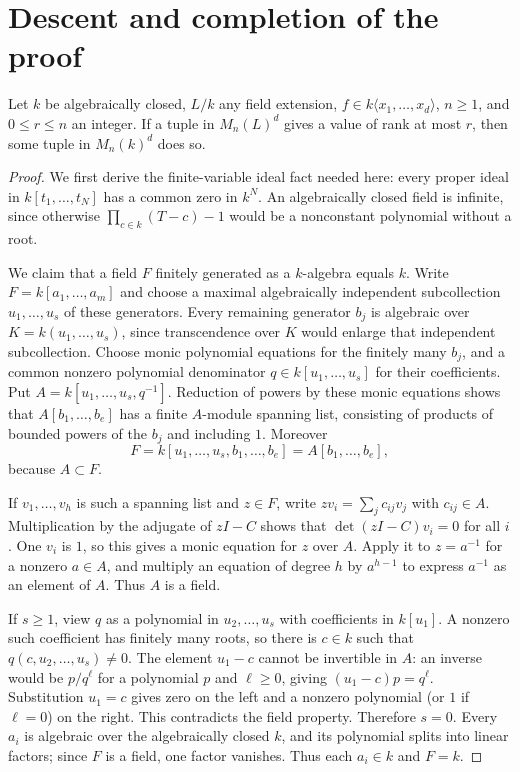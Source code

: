\documentclass{article}
\begin{document}
\section{Descent and completion of the proof}\label{sec:final}
\begin{lemma}\label{lem:descent}
Let $k$ be algebraically closed, $L/k$ any field extension, $f\in k\langle x_1,\ldots,x_d\rangle$, $n\geq1$, and $0\leq r\leq n$ an integer. If a tuple in $M_n(L)^d$ gives a value of rank at most $r$, then some tuple in $M_n(k)^d$ does so.
\end{lemma}
\begin{proof}
We first derive the finite-variable ideal fact needed here: every proper ideal in $k[t_1,\ldots,t_N]$ has a common zero in $k^N$. An algebraically closed field is infinite, since otherwise $\prod_{c\in k}(T-c)-1$ would be a nonconstant polynomial without a root.

We claim that a field $F$ finitely generated as a $k$-algebra equals $k$. Write $F=k[a_1,\ldots,a_m]$ and choose a maximal algebraically independent subcollection $u_1,\ldots,u_s$ of these generators. Every remaining generator $b_j$ is algebraic over $K=k(u_1,\ldots,u_s)$, since transcendence over $K$ would enlarge that independent subcollection. Choose monic polynomial equations for the finitely many $b_j$, and a common nonzero polynomial denominator $q\in k[u_1,\ldots,u_s]$ for their coefficients. Put $A=k[u_1,\ldots,u_s,q^{-1}]$. Reduction of powers by these monic equations shows that $A[b_1,\ldots,b_e]$ has a finite $A$-module spanning list, consisting of products of bounded powers of the $b_j$ and including $1$. Moreover
\[
 F=k[u_1,\ldots,u_s,b_1,\ldots,b_e]
 =A[b_1,\ldots,b_e],
\]
because $A\subset F$.

If $v_1,\ldots,v_h$ is such a spanning list and $z\in F$, write $zv_i=\sum_jc_{ij}v_j$ with $c_{ij}\in A$. Multiplication by the adjugate of $zI-C$ shows that $\det(zI-C)v_i=0$ for all $i$. One $v_i$ is $1$, so this gives a monic equation for $z$ over $A$. Apply it to $z=a^{-1}$ for a nonzero $a\in A$, and multiply an equation of degree $h$ by $a^{h-1}$ to express $a^{-1}$ as an element of $A$. Thus $A$ is a field.

If $s\geq1$, view $q$ as a polynomial in $u_2,\ldots,u_s$ with coefficients in $k[u_1]$. A nonzero such coefficient has finitely many roots, so there is $c\in k$ such that $q(c,u_2,\ldots,u_s)\ne0$. The element $u_1-c$ cannot be invertible in $A$: an inverse would be $p/q^\ell$ for a polynomial $p$ and $\ell\geq0$, giving $(u_1-c)p=q^\ell$. Substitution $u_1=c$ gives zero on the left and a nonzero polynomial (or $1$ if $\ell=0$) on the right. This contradicts the field property. Therefore $s=0$. Every $a_i$ is algebraic over the algebraically closed $k$, and its polynomial splits into linear factors; since $F$ is a field, one factor vanishes. Thus each $a_i\in k$ and $F=k$.


\end{proof}
\end{document}
